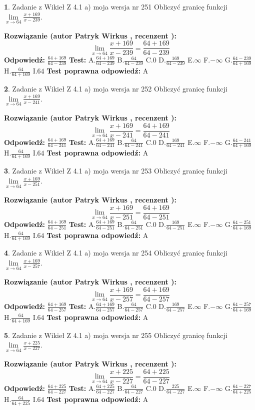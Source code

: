\documentclass[12pt, a4paper]{article}
\theoremstyle{definition} %
\newtheorem{zad}{}
\newcommand{\zadStart}[1]{\begin{zad}#1\newline}
\newcommand{\zadStop}{\end{zad}}
\newcommand{\rozwStart}[2]{\noindent \textbf{Rozwiązanie (autor #1 , recenzent #2): }\newline}
\newcommand{\rozwStop}{\newline}
\newcommand{\odpStart}{\noindent \textbf{Odpowiedź:}\newline}
\newcommand{\odpStop}{\newline}
\newcommand{\testStart}{\noindent \textbf{Test:}\newline}
\newcommand{\testStop}{\newline}
\newcommand{\kluczStart}{\noindent \textbf{Test poprawna odpowiedź:}\newline}
\newcommand{\kluczStop}{\newline}
\begin{document}
\zadStart{Zadanie z Wikieł Z 4.1 a) moja wersja nr 251}
Obliczyć granicę funkcji $\lim\limits_{x\to64}\frac{x+169}{x-239}$.
\zadStop
\rozwStart{Patryk Wirkus}{}
$$\lim\limits_{x\to64}\frac{x+169}{x-239} = \frac{64+169}{64-239}$$
\rozwStop
\odpStart
$\frac{64+169}{64-239}$
\odpStop
\testStart
A.$\frac{64+169}{64-239}$
B.$\frac{64}{64-239}$
C.$0$
D.$\frac{169}{64-239}$
E.$\infty$
F.$-\infty$
G.$\frac{64-239}{64+169}$
H.$\frac{64}{64+169}$
I.$64$
\testStop
\kluczStart
A
\kluczStop



\zadStart{Zadanie z Wikieł Z 4.1 a) moja wersja nr 252}
Obliczyć granicę funkcji $\lim\limits_{x\to64}\frac{x+169}{x-241}$.
\zadStop
\rozwStart{Patryk Wirkus}{}
$$\lim\limits_{x\to64}\frac{x+169}{x-241} = \frac{64+169}{64-241}$$
\rozwStop
\odpStart
$\frac{64+169}{64-241}$
\odpStop
\testStart
A.$\frac{64+169}{64-241}$
B.$\frac{64}{64-241}$
C.$0$
D.$\frac{169}{64-241}$
E.$\infty$
F.$-\infty$
G.$\frac{64-241}{64+169}$
H.$\frac{64}{64+169}$
I.$64$
\testStop
\kluczStart
A
\kluczStop



\zadStart{Zadanie z Wikieł Z 4.1 a) moja wersja nr 253}
Obliczyć granicę funkcji $\lim\limits_{x\to64}\frac{x+169}{x-251}$.
\zadStop
\rozwStart{Patryk Wirkus}{}
$$\lim\limits_{x\to64}\frac{x+169}{x-251} = \frac{64+169}{64-251}$$
\rozwStop
\odpStart
$\frac{64+169}{64-251}$
\odpStop
\testStart
A.$\frac{64+169}{64-251}$
B.$\frac{64}{64-251}$
C.$0$
D.$\frac{169}{64-251}$
E.$\infty$
F.$-\infty$
G.$\frac{64-251}{64+169}$
H.$\frac{64}{64+169}$
I.$64$
\testStop
\kluczStart
A
\kluczStop



\zadStart{Zadanie z Wikieł Z 4.1 a) moja wersja nr 254}
Obliczyć granicę funkcji $\lim\limits_{x\to64}\frac{x+169}{x-257}$.
\zadStop
\rozwStart{Patryk Wirkus}{}
$$\lim\limits_{x\to64}\frac{x+169}{x-257} = \frac{64+169}{64-257}$$
\rozwStop
\odpStart
$\frac{64+169}{64-257}$
\odpStop
\testStart
A.$\frac{64+169}{64-257}$
B.$\frac{64}{64-257}$
C.$0$
D.$\frac{169}{64-257}$
E.$\infty$
F.$-\infty$
G.$\frac{64-257}{64+169}$
H.$\frac{64}{64+169}$
I.$64$
\testStop
\kluczStart
A
\kluczStop



\zadStart{Zadanie z Wikieł Z 4.1 a) moja wersja nr 255}
Obliczyć granicę funkcji $\lim\limits_{x\to64}\frac{x+225}{x-227}$.
\zadStop
\rozwStart{Patryk Wirkus}{}
$$\lim\limits_{x\to64}\frac{x+225}{x-227} = \frac{64+225}{64-227}$$
\rozwStop
\odpStart
$\frac{64+225}{64-227}$
\odpStop
\testStart
A.$\frac{64+225}{64-227}$
B.$\frac{64}{64-227}$
C.$0$
D.$\frac{225}{64-227}$
E.$\infty$
F.$-\infty$
G.$\frac{64-227}{64+225}$
H.$\frac{64}{64+225}$
I.$64$
\testStop
\kluczStart
A
\kluczStop
\end{document}

